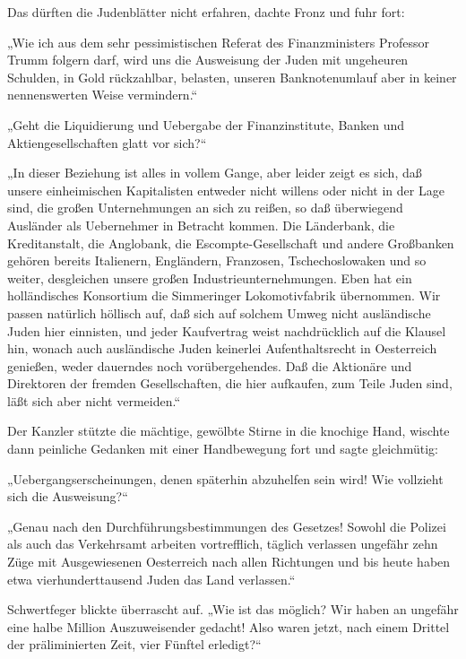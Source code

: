 Das dürften die Judenblätter nicht erfahren, dachte Fronz und fuhr
fort:

„Wie ich aus dem sehr pessimistischen Referat des Finanzministers
Professor Trumm folgern darf, wird uns die Ausweisung der Juden mit
ungeheuren Schulden, in Gold rückzahlbar, belasten, unseren
Banknotenumlauf aber in keiner nennenswerten Weise vermindern.“

„Geht die Liquidierung und Uebergabe der Finanzinstitute, Banken
und Aktiengesellschaften glatt vor sich?“

„In dieser Beziehung ist alles in vollem Gange, aber leider zeigt
es sich, daß unsere einheimischen Kapitalisten entweder nicht
willens oder nicht in der Lage sind, die großen Unternehmungen an
sich zu reißen, so daß überwiegend Ausländer als Uebernehmer in
Betracht kommen. Die Länderbank, die Kreditanstalt, die Anglobank,
die Escompte-Gesellschaft und andere Großbanken gehören bereits
Italienern, Engländern, Franzosen, Tschechoslowaken und so weiter,
desgleichen unsere großen Industrieunternehmungen. Eben hat ein
holländisches Konsortium die Simmeringer Lokomotivfabrik
übernommen. Wir passen natürlich höllisch auf, daß sich auf solchem
Umweg nicht ausländische Juden hier einnisten, und jeder
Kaufvertrag weist nachdrücklich auf die Klausel hin, wonach auch
ausländische Juden keinerlei Aufenthaltsrecht in Oesterreich
genießen, weder dauerndes noch vorübergehendes. Daß 
die Aktionäre und Direktoren der fremden Gesellschaften, die hier
aufkaufen, zum Teile Juden sind, läßt sich aber nicht vermeiden.“

Der Kanzler stützte die mächtige, gewölbte Stirne in die knochige
Hand, wischte dann peinliche Gedanken mit einer Handbewegung fort
und sagte gleichmütig:

„Uebergangserscheinungen, denen späterhin abzuhelfen sein wird! Wie
vollzieht sich die Ausweisung?“

„Genau nach den Durchführungsbestimmungen des Gesetzes! Sowohl die
Polizei als auch das Verkehrsamt arbeiten vortrefflich, täglich
verlassen ungefähr zehn Züge mit Ausgewiesenen Oesterreich nach
allen Richtungen und bis heute haben etwa vierhunderttausend Juden
das Land verlassen.“

Schwertfeger blickte überrascht auf. „Wie ist das möglich? Wir
haben an ungefähr eine halbe Million Auszuweisender gedacht! Also
waren jetzt, nach einem Drittel der präliminierten Zeit, vier
Fünftel erledigt?“

